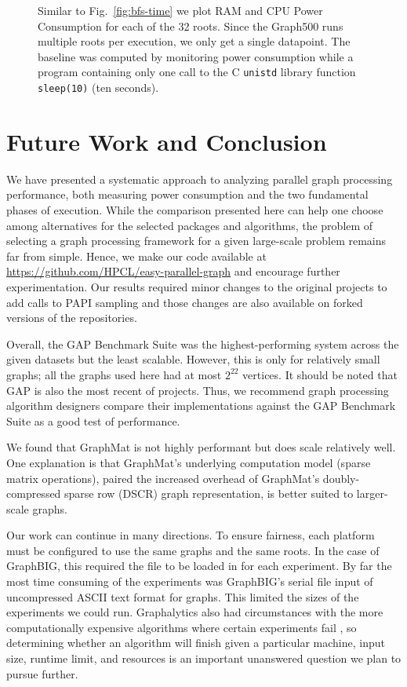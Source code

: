 \documentclass{llncs}
\begin{document}
\begin{figure}
\begin{minipage}{0.48\linewidth}
	\end{minipage}
	\caption{Similar to Fig.~\ref{fig:bfs-time} we plot RAM and CPU Power Consumption for each of the 32 roots. Since the Graph500 runs multiple roots per execution, we only get a single datapoint. The baseline was computed by monitoring power consumption while a program containing only one call to the C \texttt{unistd} library function \texttt{sleep(10)} (ten seconds).}
	\label{fig:power}
\end{figure}

\section{Future Work and Conclusion}
We have presented a systematic approach to analyzing parallel graph processing performance, both measuring power consumption and the two fundamental phases of execution. While the comparison presented here can help one choose among alternatives for the selected packages and algorithms, the problem of selecting a graph processing framework for a given large-scale problem remains far from simple. Hence, we make our code available at \url{https://github.com/HPCL/easy-parallel-graph} and encourage further experimentation. Our results required minor changes to the original projects to add calls to PAPI sampling and those changes are also available on forked versions of the repositories. 

Overall, the GAP Benchmark Suite was the highest-performing system across the given datasets but the least scalable. However, this is only for relatively small graphs; all the graphs used here had at most $2^{22}$ vertices. It should be noted that GAP is also the most recent of projects. Thus, we recommend graph processing algorithm designers compare their implementations against the GAP Benchmark Suite as a good test of performance.

We found that GraphMat is not highly performant but does scale relatively well. One explanation is that GraphMat's underlying computation model (sparse matrix operations), paired the increased overhead of GraphMat's doubly-compressed sparse row (DSCR) graph representation, is better suited to larger-scale graphs.

Our work can continue in many directions. To ensure fairness, each platform must be configured to use the same graphs and the same roots. In the case of GraphBIG, this required the file to be loaded in for each experiment. By far the most time consuming of the experiments was GraphBIG's serial file input of uncompressed ASCII text format for graphs. This limited the sizes of the experiments we could run. Graphalytics also had circumstances with the more computationally expensive algorithms  where certain experiments fail \cite{Iosup:2016:Graphalyticstech}, so determining whether an algorithm will finish given a particular machine, input size, runtime limit, and resources is an important unanswered question we plan to pursue further.



\end{document}
